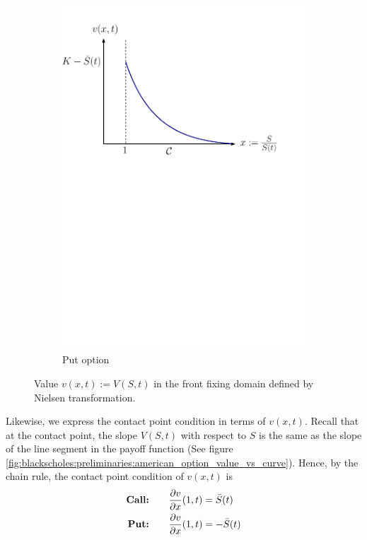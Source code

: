 \begin{figure}[H]
\begin{subfigure}{0.45\textwidth}
    \includegraphics[width=\textwidth]{chapters/chapter2/NielsenPutOption}
    \caption{Put option}
    \label{fig:blackscholes:frontfixingmethod:nielsen_put_value_vs_curve}
  \end{subfigure}
  \caption{Value $v(x,t) := V(S,t)$ in the front fixing domain defined by Nielsen transformation.}
  \label{fig:blackscholes:frontfixingmethod:nielsen_value_vs_curve}
\end{figure}
Likewise, we express the contact point condition in terms of $v(x,t)$. Recall that at the contact point, the slope $V(S,t)$ with respect to $S$ is the same as the slope of the line segment in the payoff function (See figure \ref{fig:blackscholes:preliminaries:american_option_value_vs_curve}). Hence, by the chain rule, the contact point condition of $v(x,t)$ is
\begin{subequations} \label{eq:blackscholes:frontfixingmethod:nielsen:american_options_optimal_price_contact_point_condition}
  \begin{align}
    \text{\textbf{Call:}} \qquad & \dfrac{\partial v}{\partial x}(1, t) = \bar{S}(t) \\
    \text{\textbf{Put:}} \qquad & \dfrac{\partial v}{\partial x}(1, t) = -\bar{S}(t)
  \end{align}
\end{subequations}
